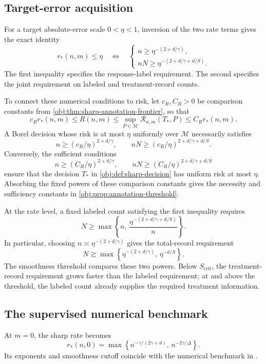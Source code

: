 \subsection{Target-error acquisition}

For a target absolute-error scale \(0<\eta<1\), inversion of the two rate terms gives the exact identity
\[
r_*(n,m)\le\eta
\quad\Longleftrightarrow\quad
\begin{cases}
n\ge \eta^{-(2+d/\gamma)},\\
nN\ge \eta^{-(2+d/\gamma+d/S)}.
\end{cases}
\]
The first inequality specifies the response-label requirement. The second specifies the joint requirement on labeled and treatment-record counts.

To connect these numerical conditions to risk, let \(c_R,C_R>0\) be comparison constants from \cref{obj:thm:sharp-annotation-frontier}, so that
\[
c_Rr_*(n,m)
\le R(n,m)
\le \sup_{P\in\mathcal M}\mathcal R_{n,m}(T_*,P)
\le C_Rr_*(n,m).
\]
A Borel decision whose risk is at most \(\eta\) uniformly over \(\mathcal M\) necessarily satisfies
\[
n\ge (c_R/\eta)^{2+d/\gamma},
\qquad
nN\ge (c_R/\eta)^{2+d/\gamma+d/S}.
\]
Conversely, the sufficient conditions
\[
n\ge (C_R/\eta)^{2+d/\gamma},
\qquad
nN\ge (C_R/\eta)^{2+d/\gamma+d/S}
\]
ensure that the decision \(T_*\) in \cref{obj:def:sharp-decision} has uniform risk at most \(\eta\). Absorbing the fixed powers of these comparison constants gives the necessity and sufficiency constants in \cref{obj:prop:annotation-threshold}.

At the rate level, a fixed labeled count satisfying the first inequality requires
\[
N\ge
\max\left\{
n,\,
\frac{\eta^{-(2+d/\gamma+d/S)}}{n}
\right\}.
\]
In particular, choosing \(n\asymp\eta^{-(2+d/\gamma)}\) gives the total-record requirement
\[
N\gtrsim
\max\left\{
\eta^{-(2+d/\gamma)},\,
\eta^{-d/S}
\right\}.
\]
The smoothness threshold compares these two powers. Below \(S_{\mathrm{crit}}\), the treatment-record requirement grows faster than the labeled requirement; at and above the threshold, the labeled count already supplies the required treatment information.

\subsection{The supervised numerical benchmark}

At \(m=0\), the sharp rate becomes
\[
r_*(n,0)
=
\max\left\{
n^{-\gamma/(2\gamma+d)},\,
n^{-2\gamma/\Delta}
\right\}.
\]
Its exponents and smoothness cutoff coincide with the numerical benchmark in \citet[Section 3, Theorem 1]{KennedyBalakrishnanRobinsWasserman2024}.

